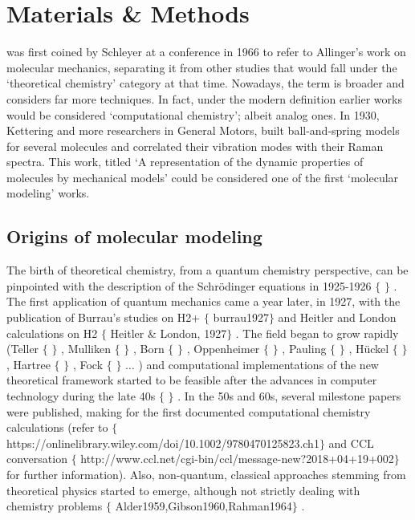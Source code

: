 \chapter{Materials \& Methods}
\label{chap:02}

 was first coined by Schleyer at a conference in 1966 to refer to Allinger’s work on molecular mechanics, separating it from other studies that would fall under the ‘theoretical chemistry’ category at that time. Nowadays, the term is broader and considers far more techniques. In fact, under the modern definition earlier works would be considered ‘computational chemistry’; albeit analog ones. In 1930, Kettering and more researchers in General Motors, built ball-and-spring models for several molecules and correlated their vibration modes with their Raman spectra. This work, titled ‘A representation of the dynamic properties of molecules by mechanical models’ could be considered one of the first ‘molecular modeling’ works.

\section{Origins of molecular modeling}
The birth of theoretical chemistry, from a quantum chemistry perspective, can be pinpointed with the description of the Schrödinger equations in 1925-1926 $ \{ $ $ \} $ . The first application of quantum mechanics came a year later, in 1927, with the publication of Burrau’s studies on H2+ $ \{ $ burrau1927$ \} $  and Heitler and London calculations on H2 $ \{ $ Heitler $\&$  London, 1927$ \} $ . The field began to grow rapidly (Teller $ \{ $ $ \} $ , Mulliken $ \{ $ $ \} $ , Born $ \{ $ $ \} $ , Oppenheimer $ \{ $ $ \} $ , Pauling $ \{ $ $ \} $ , Hückel $ \{ $ $ \} $ , Hartree $ \{ $ $ \} $ , Fock $ \{ $ $ \} $ $ \ldots $ ) and computational implementations of the new theoretical framework started to be feasible after the advances in computer technology during the late 40s $ \{ $ $ \} $ . In the 50s and 60s, several milestone papers were published, making for the first documented computational chemistry calculations (refer to $ \{ $ https://onlinelibrary.wiley.com/doi/10.1002/9780470125823.ch1$ \} $  and CCL conversation $ \{ $ http://www.ccl.net/cgi-bin/ccl/message-new?2018+04+19+002$ \} $  for further information). Also, non-quantum, classical approaches stemming from theoretical physics started to emerge, although not strictly dealing with chemistry problems $ \{ $ Alder1959,Gibson1960,Rahman1964$ \} $ .

